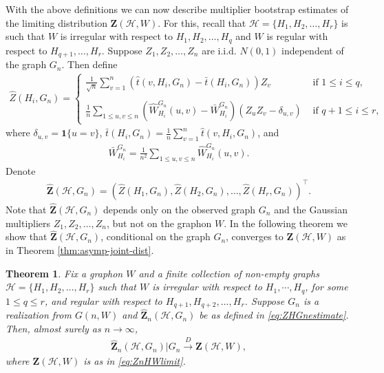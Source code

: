 \documentclass[11pt,reqno]{amsart}
\numberwithin{equation}{section}
\newcommand{\cH}{{\mathcal H}}
\newtheorem{theorem}{Theorem}[section]
\theoremstyle{definition}
\begin{document}
With the above definitions we can now describe multiplier bootstrap estimates of the limiting distribution $\bm Z(\cH, W)$. For this, recall that $\mathcal{H} = \{ H_1, H_2, \ldots, H_r \}$ is such that $W$ is irregular with respect to $H_1, H_2, \ldots, H_q$ and $W$ is regular with respect to $H_{q+1}, \ldots, H_{r}$. Suppose 
 $Z_1, Z_2, \ldots, Z_n$ are i.i.d. $N(0, 1)$ independent of the graph $G_n$. Then define 
\begin{align}\label{eq:ZHestimate}
    \hat Z(H_{i}, G_{n}) = 
    \begin{cases}
        \frac{1}{\sqrt n}\sum_{v=1}^{n} ( \hat t(v, H_i, G_n) -  \bar t(H_i, G_n) ) Z_v  & \text{ if }  1 \leq i \leq q, \\ \\ 
   \frac{1}{n} \sum_{1 \leq u, v \leq n} ( \hat W^{G_n}_{H_i}(u, v) - \bar W^{G_n}_{H_i} ) \left(Z_{u}Z_{v} - \delta_{u, v}\right) & \text{ if } q+1 \leq i \leq  r , 
    \end{cases}
\end{align} 
where $\delta_{u, v} = \bm{1}\{u=v\}$, $ \bar t(H_i, G_n) = \frac{1}{n} \sum_{v=1}^n \hat t(v, H_i, G_n)$, and 
\begin{align}\label{eq:averageW}
\bar W^{G_n}_{H_i} = \frac{1}{n^2} \sum_{1 \leq u, v \leq n} \hat W^{G_n}_{H_i}(u, v) . 
\end{align}
Denote 
\begin{align}\label{eq:ZHGnestimate}
\hat {\bm Z}(\cH, G_n) = ( \hat{Z}(H_1, G_n), \hat{Z}(H_2, G_n), \ldots, \hat{Z}(H_r, G_n) )^\top . 
\end{align} 
Note that $\hat {\bm Z}(\cH, G_n) $ depends only on the observed graph $G_n$ and the Gaussian multipliers $Z_1, Z_2, \ldots, Z_n$, but not on the graphon $W$. In the following theorem we show that $\hat {\bm Z}(\cH, G_n) $, conditional on the graph $G_n$, converges to $\bm{Z}(\mathcal{H},W)$ as in Theorem \ref{thm:asymp-joint-dist}.


\begin{theorem}\label{thm:ZnHGn} 
Fix a graphon $W$ and a finite collection of non-empty graphs $\mathcal H = \{ H_1, H_2, \ldots, H_r \}$ such that $W$ is irregular with respect to $H_{1},\cdots, H_{q}$, for some $1\leq q \leq r$, and regular with respect to $H_{q+1}, H_{q+2}, \ldots, H_r$. Suppose $G_n$ is a realization from $G(n, W)$ and $\hat{\bm Z}_n(\mathcal H, G_n)$ be as defined in \eqref{eq:ZHGnestimate}. Then, almost surely as $n\rightarrow\infty$,
\begin{align}\label{eq:ZHGnestimatedistribution}
\hat{\bm Z}_n(\mathcal H, G_n)|G_n \stackrel{D} \rightarrow \bm{Z}(\mathcal{H},W) , 
\end{align} 
where $\bm{Z}(\mathcal{H},W)$ is as in \eqref{eq:ZnHWlimit}. 
\end{theorem} 
\end{document}
